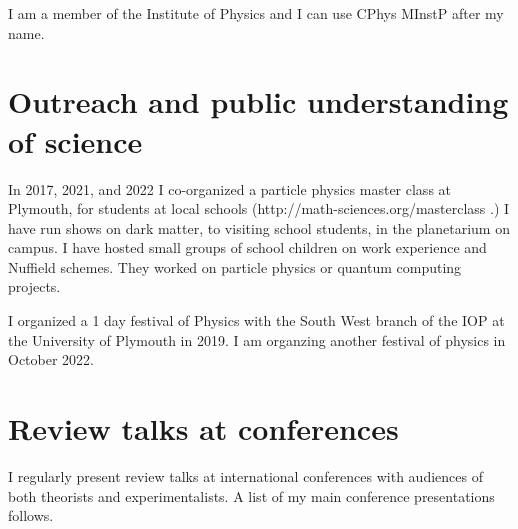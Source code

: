 \documentclass[12pt]{article}
\begin{document}
I am a member of the Institute of Physics and I can use
CPhys MInstP after my name.

\section{Outreach and public understanding of science}

In 2017, 2021, and 2022 I co-organized a particle physics master 
class at Plymouth, for students at local schools  (http://math-sciences.org/masterclass .)
I have run shows on dark matter, to visiting school students,
in the planetarium on campus. I have hosted small groups
of school children on work experience and Nuffield 
schemes. They worked on particle physics or quantum computing
projects.

I organized a 1 day festival of Physics with the South West branch of
the IOP at the University of Plymouth in 2019. I am organzing another
festival of physics in October 2022.



\section{Review talks at conferences}

I regularly present review talks at international
conferences with audiences of both theorists and experimentalists.
A list of my main conference presentations follows.
\end{document}
